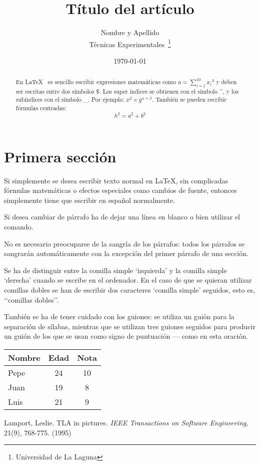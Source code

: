 \documentclass[a4paper,12pt]{article}
\begin{document}
\title{Título del artículo}
\author{Nombre y Apellido \\
         Técnicas Experimentales~\footnote{Universidad de La Laguna}
       }
\date{\today}
\maketitle
\begin{abstract}
 En \LaTeX{}~\cite{Lam:86} es sencillo escribir expresiones
 matemáticas como $a=\sum_{i=1}^{10} {x_i}^{3}$
 y deben ser escritas entre dos símbolos \$.
 Los super índices se obtienen con el símbolo \^{}, y
 los subíndices con el símbolo \_.
 Por ejemplo: $x^2 \times y^{\alpha + \beta}$.
 También se pueden escribir fórmulas centradas:
 \[h^2=a^2 + b^2 \]
\end{abstract}

\section{Primera sección}
 Si simplemente se desea escribir texto normal en LaTeX,
 sin complicadas f\'ormulas matem\'aticas o efectos especiales
 como cambios de fuente, entonces simplemente tiene que escribir
 en espa\~nol normalmente.\par
 Si desea cambiar de párrafo ha de dejar una línea en blanco o bien
 utilizar el comando.\par
 No es necesario preocuparse de la sangría de los párrafos:
 todos los párrafos se sangrarán automáticamente con la excepción
 del primer párrafo de una sección.

 Se ha de distinguir entre la comilla simple ‘izquierda’
 y la comilla simple ‘derecha’ cuando se escribe en el ordenador.
 En el caso de que se quieran utilizar comillas dobles se han de
 escribir dos caracteres ‘comilla simple’ seguidos, esto es,
 ‘‘comillas dobles’’.

 También se ha de tener cuidado con los guiones: se utiliza un 
 guión para la separación de sílabas, mientras que se utilizan
 tres guiones seguidos para producir un guión de los que se usan
como signo de puntuación --- como en esta oración.
\bigskip
\begin{tabular}{|l|c|c|}
\hline
 Nombre & Edad & Nota \\ \hline
 Pepe & 24 & 10 \\ \hline
 Juan & 19 & 8 \\ \hline
 Luis & 21 & 9 \\ \hline
\end{tabular}
\begin{thebibliography}{00}
  Lamport, Leslie.
  TLA in pictures.
  \emph{IEEE Transactions on Software Engineering},
  21(9), 768-775.
  (1995)
\end{thebibliography}
\end{document}
